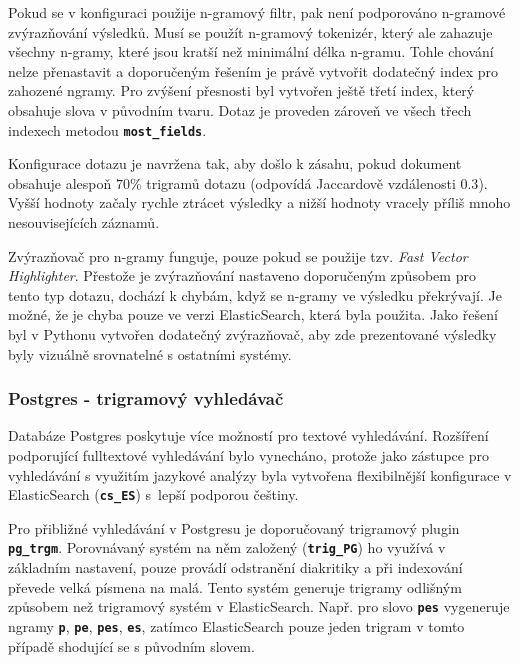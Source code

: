\documentclass[11pt,letterpaper,oneside,openright]{book}
\newcommand{\bftt}[1]{\texttt{\textbf{#1}}}
\begin{document}
Pokud se v konfiguraci použije n-gramový filtr, pak není podporováno n-gramové
zvýrazňování výsledků. Musí se použít n-gramový tokenizér, který ale zahazuje
všechny n-gramy, které jsou kratší než minimální délka n-gramu. Tohle chování
nelze přenastavit a doporučeným řešením je právě vytvořit dodatečný index pro
zahozené ngramy. Pro zvýšení přesnosti byl vytvořen ještě třetí index, který
obsahuje slova v původním tvaru. Dotaz je proveden zároveň ve všech třech
indexech metodou \bftt{most\_fields}.

Konfigurace dotazu je navržena tak, aby došlo k zásahu, pokud dokument obsahuje
alespoň $70\%$ trigramů dotazu (odpovídá Jaccardově vzdálenosti $0.3$). Vyšší
hodnoty začaly rychle ztrácet výsledky a nižší hodnoty vracely příliš mnoho
nesouvisejících záznamů.

Zvýrazňovač pro n-gramy funguje, pouze pokud se použije tzv. \textit{Fast
Vector Highlighter}. Přestože je zvýrazňování nastaveno doporučeným způsobem
pro tento typ dotazu, dochází k chybám, když se n-gramy ve výsledku překrývají.
Je možné, že je chyba pouze ve verzi ElasticSearch, která byla použita. Jako
řešení byl v Pythonu vytvořen dodatečný zvýrazňovač, aby zde prezentované
výsledky byly vizuálně srovnatelné s ostatními systémy.

\subsubsection{Postgres - trigramový vyhledávač}
Databáze Postgres poskytuje více možností pro textové vyhledávání. Rozšíření
podporující fulltextové vyhledávání bylo vynecháno, protože jako zástupce pro
vyhledávání s využitím jazykové analýzy byla vytvořena flexibilnější
konfigurace v ElasticSearch (\bftt{cs\_ES}) s~lepší podporou češtiny.

Pro přibližné vyhledávání v Postgresu je doporučovaný trigramový plugin
\bftt{pg\_trgm}. Porovnávaný systém na něm založený (\bftt{trig\_PG}) ho
využívá v základním nastavení, pouze provádí odstranění diakritiky a při
indexování převede velká písmena na malá. Tento systém generuje trigramy
odlišným způsobem než trigramový systém v ElasticSearch. Např. pro slovo
\bftt{pes} vygeneruje ngramy \bftt{p}, \bftt{pe}, \bftt{pes}, \bftt{es},
zatímco ElasticSearch pouze jeden trigram v tomto případě shodující se s
původním slovem.



\end{document}
